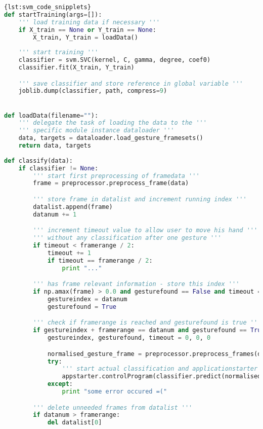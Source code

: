 \begin{lstlisting}[float=*,language=Python,caption={Code Snipplets},label={lst:svm_code_snipplets}]{lst:svm_code_snipplets}
def startTraining(args=[]):
	''' load training data if necessary '''
	if X_train == None or Y_train == None:
		X_train, Y_train = loadData()
	
	''' start training '''
	classifier = svm.SVC(kernel, C, gamma, degree, coef0)
	classifier.fit(X_train, Y_train)

	''' save classifier and store reference in global variable '''
	joblib.dump(classifier, path, compress=9)


def loadData(filename=""):
	''' delegate the task of loading the data to the ''' 
	''' specific module instance dataloader '''
	data, targets = dataloader.load_gesture_framesets()
	return data, targets
	
def classify(data):
	if classifier != None:
		''' start first preprocessing of framedata '''
		frame = preprocessor.preprocess_frame(data)

		''' store frame in datalist and increment running index '''
		datalist.append(frame)
		datanum += 1

		''' increment timeout value to allow user to move his hand '''
		''' without any classification after one gesture '''
		if timeout < framerange / 2:
			timeout += 1
			if timeout == framerange / 2:
				print "..."

		''' has frame relevant information - store this index '''
		if np.amax(frame) > 0.0 and gesturefound == False and timeout == framerange / 2:
			gestureindex = datanum
			gesturefound = True

		''' check if framerange is reached and gesturefound is true '''
		if gestureindex + framerange == datanum and gesturefound == True:
			gestureindex, gesturefound, timeout = 0, 0, 0

			normalised_gesture_frame = preprocessor.preprocess_frames(datalist[-framerange:])
			try:
				''' start actual classification and applicationstarter '''
				appstarter.controlProgram(classifier.predict(normalised_gesture_frame)[0])
			except:
				print "some error occured =("

		''' delete unneeded frames from datalist '''
		if datanum > framerange:
			del datalist[0]
\end{lstlisting}


